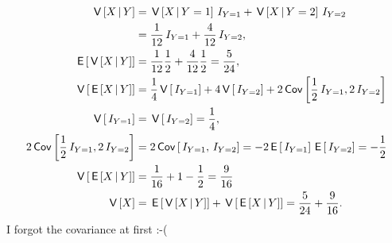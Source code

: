 \begin{exercise}
\begin{solution}
\begin{align}
\V{X\given Y} &= \V{X\given Y=1}\1{Y=1} + \V{X\given Y=2}\1{Y=2} \\
&= \frac{1}{12} \1{Y=1} + \frac{4}{12} \1{Y=2}, \\
\E{\V{X\given Y}} &= \frac{1}{12} \frac{1}{2} + \frac{4}{12} \frac{1}{2} = \frac{5}{24}, \\
\V{\E{X \given Y}} &= \frac{1}{4}\V{\1{Y=1}} + 4\V{\1{Y=2}} + 2\cov{\frac{1}{2}\1{Y=1}, 2\1{Y=2}} \\
\V{\1{Y=1}} &= \V{\1{Y=2}}  = \frac{1}{4}, \\
2\cov{\frac{1}{2}\1{Y=1}, 2\1{Y=2}} &= 2\cov{\1{Y=1}, \1{Y=2}}=-2\E{\1{Y=1}}\E{\1{Y=2}} = -\frac{1}{2}\\
\V{\E{X \given Y}} &= \frac{1}{16} + 1 - \frac{1}{2} = \frac{9}{16}\\
\V X &= \E{\V{X\given Y}} + \V{\E{X\given Y}} = \frac{5}{24} + \frac{9}{16}.
\end{align}
I forgot the covariance at first :-(
\end{solution}
\end{exercise}
